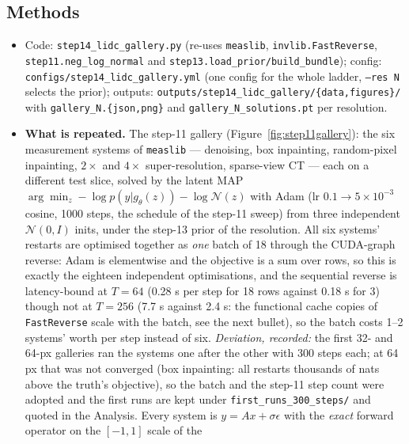 \documentclass[11pt]{article}
\begin{document}
\subsection{Methods}
\begin{itemize}
  \item Code: \texttt{step14\_lidc\_gallery.py} (re-uses \texttt{measlib},
        \texttt{invlib.FastReverse}, \texttt{step11.neg\_log\_normal} and
        \texttt{step13.load\_prior/build\_bundle}); config:
        \texttt{configs/step14\_lidc\_gallery.yml} (one config for the whole
        ladder, \texttt{--res N} selects the prior); outputs:
        \texttt{outputs/step14\_lidc\_gallery/\{data,figures\}/} with
        \texttt{gallery\_N.\{json,png\}} and \texttt{gallery\_N\_solutions.pt}
        per resolution.
  \item \textbf{What is repeated.} The step-11 gallery
        (Figure~\ref{fig:step11gallery}): the six measurement systems of
        \texttt{measlib} --- denoising, box inpainting, random-pixel
        inpainting, $2\times$ and $4\times$ super-resolution, sparse-view
        CT --- each on a different test slice, solved by the latent MAP
        $\arg\min_z -\log p(y|g_\theta(z)) - \log\mathcal{N}(z)$ with Adam
        (lr $0.1 \to 5\times10^{-3}$ cosine, 1000 steps, the schedule of the
        step-11 sweep) from three independent $\mathcal{N}(0,I)$ inits,
        under the step-13 prior of the resolution. All six systems' restarts
        are optimised together as \emph{one} batch of 18 through the
        CUDA-graph reverse: Adam is elementwise and the objective is a sum
        over rows, so this is exactly the eighteen independent
        optimisations, and the sequential reverse is latency-bound at
        $T = 64$ (0.28 s per step for 18 rows against 0.18 s for 3) though
        not at $T = 256$ (7.7 s against 2.4 s: the functional cache copies
        of \texttt{FastReverse} scale with the batch, see the next bullet),
        so the batch costs 1--2 systems' worth per step instead of six.
        \emph{Deviation, recorded:} the first 32- and 64-px galleries
        ran the systems one after the other with 300 steps each; at 64 px
        that was not converged (box inpainting: all restarts thousands of
        nats above the truth's objective), so the batch and the step-11 step
        count were adopted and the first runs are kept under
        \texttt{first\_runs\_300\_steps/} and quoted in the Analysis.
        Every system is $y = Ax + \sigma\epsilon$
        with the \emph{exact} forward operator on the $[-1,1]$ scale of the

\end{itemize}
\end{document}
